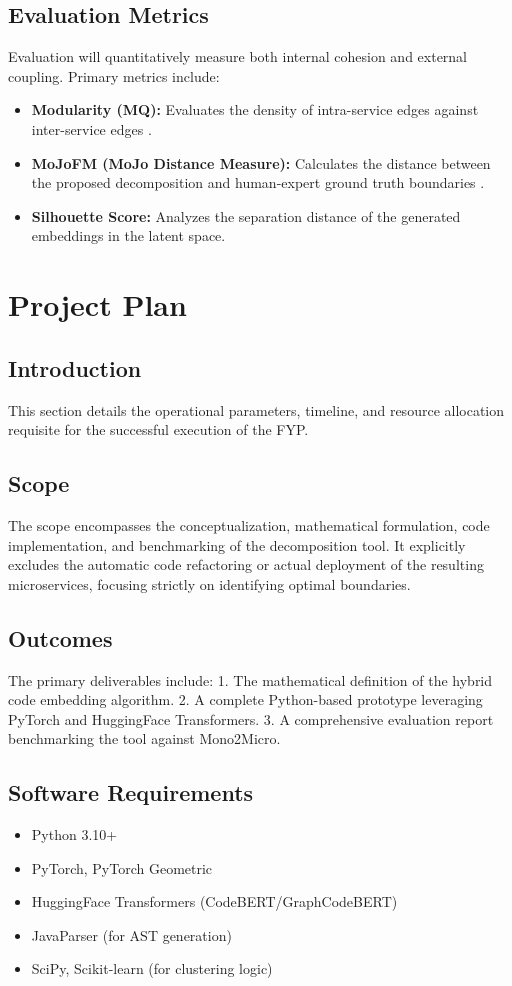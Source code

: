 \documentclass[12pt, a4paper]{article}
\begin{document}
\subsection{Evaluation Metrics}
Evaluation will quantitatively measure both internal cohesion and external coupling. Primary metrics include:
\begin{itemize}
    \item \textbf{Modularity (MQ):} Evaluates the density of intra-service edges against inter-service edges \cite{mitchell2007}.
    \item \textbf{MoJoFM (MoJo Distance Measure):} Calculates the distance between the proposed decomposition and human-expert ground truth boundaries \cite{quattrocchi2024}.
    \item \textbf{Silhouette Score:} Analyzes the separation distance of the generated embeddings in the latent space.
\end{itemize}

\section{Project Plan}

\subsection{Introduction}
This section details the operational parameters, timeline, and resource allocation requisite for the successful execution of the FYP.

\subsection{Scope}
The scope encompasses the conceptualization, mathematical formulation, code implementation, and benchmarking of the decomposition tool. It explicitly excludes the automatic code refactoring or actual deployment of the resulting microservices, focusing strictly on identifying optimal boundaries.

\subsection{Outcomes}
The primary deliverables include:
1. The mathematical definition of the hybrid code embedding algorithm.
2. A complete Python-based prototype leveraging PyTorch and HuggingFace Transformers.
3. A comprehensive evaluation report benchmarking the tool against Mono2Micro.

\subsection{Software Requirements}
\begin{itemize}
    \item Python 3.10+
    \item PyTorch, PyTorch Geometric
    \item HuggingFace Transformers (CodeBERT/GraphCodeBERT)
    \item JavaParser (for AST generation)
    \item SciPy, Scikit-learn (for clustering logic)
\end{itemize}
\end{document}
